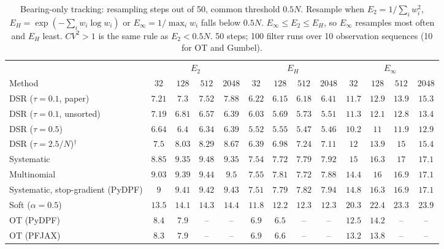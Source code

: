 \begin{table}[ht]
\centering
\small
\caption{Bearing-only tracking: resampling steps out of 50, common threshold $0.5N$. Resample when $E_2=1/\sum_iw_i^2$, $E_H=\exp(-\sum_iw_i\log w_i)$ or $E_\infty=1/\max_iw_i$ falls below $0.5N$. $E_\infty\le E_2\le E_H$, so $E_\infty$ resamples most often and $E_H$ least. $CV^2>1$ is the same rule as $E_2<0.5N$. 50 steps; 100 filter runs over 10 observation sequences (10 for OT and Gumbel).}
\label{tab:trigger-fixed-bearing-resampling_steps}
\begin{adjustbox}{max width=\linewidth}
\begin{tabular}{lcccc|cccc|cccc}
\toprule
 & \multicolumn{4}{c}{$E_2$} & \multicolumn{4}{c}{$E_H$} & \multicolumn{4}{c}{$E_\infty$} \\
\cmidrule(lr){2-5} \cmidrule(lr){6-9} \cmidrule(lr){10-13}
Method & $32$ & $128$ & $512$ & $2048$ & $32$ & $128$ & $512$ & $2048$ & $32$ & $128$ & $512$ & $2048$ \\
\midrule
DSR ($\tau{=}0.1$, paper) & $7.21$ & $7.3$ & $7.52$ & $7.88$ & $6.22$ & $6.15$ & $6.18$ & $6.41$ & $11.7$ & $12.9$ & $13.9$ & $15.3$ \\
DSR ($\tau{=}0.1$, unsorted) & $7.19$ & $6.81$ & $6.57$ & $6.39$ & $6.03$ & $5.69$ & $5.73$ & $5.51$ & $11.3$ & $12.1$ & $12.8$ & $13.4$ \\
DSR ($\tau{=}0.5$) & $6.64$ & $6.4$ & $6.34$ & $6.39$ & $5.52$ & $5.55$ & $5.47$ & $5.46$ & $10.2$ & $11$ & $11.9$ & $12.9$ \\
DSR ($\tau{=}2.5/N$)$^\dagger$ & $7.5$ & $8.03$ & $8.29$ & $8.67$ & $6.39$ & $6.98$ & $7.24$ & $7.11$ & $12$ & $13.9$ & $15$ & $15.4$ \\
\midrule
Systematic & $8.85$ & $9.35$ & $9.48$ & $9.35$ & $7.54$ & $7.72$ & $7.79$ & $7.92$ & $15$ & $16.3$ & $17$ & $17.1$ \\
Multinomial & $9.03$ & $9.39$ & $9.44$ & $9.5$ & $7.55$ & $7.81$ & $7.72$ & $7.88$ & $14.4$ & $16$ & $16.9$ & $17.1$ \\
Systematic, stop-gradient (PyDPF) & $9$ & $9.41$ & $9.42$ & $9.43$ & $7.51$ & $7.79$ & $7.82$ & $7.94$ & $14.8$ & $16.3$ & $16.9$ & $17.1$ \\
Soft ($\alpha{=}0.5$) & $13.5$ & $14.1$ & $14.3$ & $14.4$ & $11.8$ & $12.2$ & $12.3$ & $12.3$ & $20.3$ & $22.4$ & $23.3$ & $23.9$ \\
OT (PyDPF) & $8.4$ & $7.9$ & -- & -- & $6.9$ & $6.5$ & -- & -- & $12.5$ & $14.2$ & -- & -- \\
OT (PFJAX) & $8.3$ & $7.9$ & -- & -- & $6.9$ & $6.6$ & -- & -- & $13.2$ & $13.8$ & -- & -- \\

\end{tabular}
\end{adjustbox}
\end{table}
